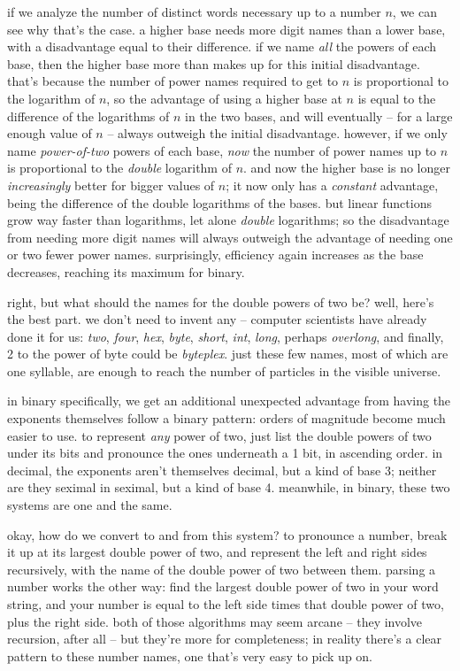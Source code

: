 \documentclass[../best.tex]{subfiles}
\begin{document}
if we analyze the number of distinct words necessary up to a number $n$, we can see why that's the case. a higher base needs more digit names than a lower base, with a disadvantage equal to their difference. if we name \emph{all} the powers of each base, then the higher base more than makes up for this initial disadvantage. that's because the number of power names required to get to $n$ is proportional to the logarithm of $n$, so the advantage of using a higher base at $n$ is equal to the difference of the logarithms of $n$ in the two bases, and will eventually -- for a large enough value of $n$ -- always outweigh the initial disadvantage. however, if we only name \emph{power-of-two} powers of each base, \emph{now} the number of power names up to $n$ is proportional to the \emph{double} logarithm of $n$. and now the higher base is no longer \emph{increasingly} better for bigger values of $n$; it now only has a \emph{constant} advantage, being the difference of the double logarithms of the bases. but linear functions grow way faster than logarithms, let alone \emph{double} logarithms; so the disadvantage from needing more digit names will always outweigh the advantage of needing one or two fewer power names. surprisingly, efficiency again increases as the base decreases, reaching its maximum for binary.\myfootnote{}

right, but what should the names for the double powers of two be? well, here's the best part. we don't need to invent any -- computer scientists have already done it for us: {\it two}, {\it four}, {\it hex}, {\it byte}, {\it short}, {\it int}, {\it long}, perhaps {\it overlong}, and finally, 2 to the power of byte could be {\it byteplex}.\myfootnote{} just these few names, most of which are one syllable, are enough to reach the number of particles in the visible universe.\myfootnote{}

in binary specifically, we get an additional unexpected advantage from having the exponents themselves follow a binary pattern: orders of magnitude become much easier to use. to represent \emph{any} power of two, just list the double powers of two under its bits and pronounce the ones underneath a 1 bit, in ascending order. in decimal, the exponents aren't themselves decimal, but a kind of base 3; neither are they seximal in seximal, but a kind of base 4. meanwhile, in binary, these two systems are one and the same.

okay, how do we convert to and from this system? to pronounce a number, break it up at its largest double power of two, and represent the left and right sides recursively, with the name of the double power of two between them. parsing a number works the other way: find the largest double power of two in your word string, and your number is equal to the left side times that double power of two, plus the right side. both of those algorithms may seem arcane -- they involve recursion, after all\myfootnote{} -- but they're more for completeness; in reality there's a clear pattern to these number names, one that's very easy to pick up on.
\end{document}
